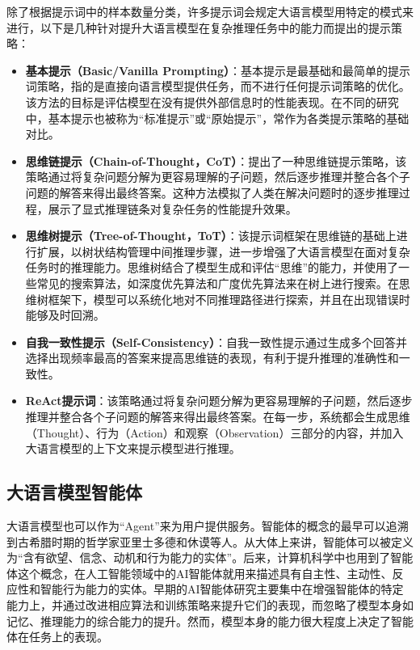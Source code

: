 除了根据提示词中的样本数量分类，许多提示词会规定大语言模型用特定的模式来进行，以下是几种针对提升大语言模型在复杂推理任务中的能力而提出的提示策略：

\begin{itemize}
    \item \textbf{基本提示（Basic/Vanilla Prompting）}：基本提示是最基础和最简单的提示词策略，指的是直接向语言模型提供任务，而不进行任何提示词策略的优化。该方法的目标是评估模型在没有提供外部信息时的性能表现。在不同的研究中，基本提示也被称为“标准提示”或“原始提示”，常作为各类提示策略的基础对比。
    \item \textbf{思维链提示（Chain-of-Thought，CoT）}：\cite{Wang2023a}提出了一种思维链提示策略，该策略通过将复杂问题分解为更容易理解的子问题，然后逐步推理并整合各个子问题的解答来得出最终答案。这种方法模拟了人类在解决问题时的逐步推理过程，展示了显式推理链条对复杂任务的性能提升效果。
    \item \textbf{思维树提示（Tree-of-Thought，ToT）}：该提示词框架在思维链的基础上进行扩展，以树状结构管理中间推理步骤，进一步增强了大语言模型在面对复杂任务时的推理能力。思维树结合了模型生成和评估“思维”的能力，并使用了一些常见的搜索算法，如深度优先算法和广度优先算法来在树上进行搜索。在思维树框架下，模型可以系统化地对不同推理路径进行探索，并且在出现错误时能够及时回溯。
    \item \textbf{自我一致性提示（Self-Consistency）}：自我一致性提示通过生成多个回答并选择出现频率最高的答案来提高思维链的表现，有利于提升推理的准确性和一致性。
    \item \textbf{ReAct提示词}：该策略通过将复杂问题分解为更容易理解的子问题，然后逐步推理并整合各个子问题的解答来得出最终答案。在每一步，系统都会生成思维（Thought）、行为（Action）和观察（Observation）三部分的内容，并加入大语言模型的上下文来提示模型进行推理。
\end{itemize}

\subsection{大语言模型智能体}

大语言模型也可以作为“Agent”来为用户提供服务。智能体的概念的最早可以追溯到古希腊时期的哲学家亚里士多德和休谟等人\cite{Zalta2019}。从大体上来讲，智能体可以被定义为“含有欲望、信念、动机和行为能力的实体”\cite{Xi2023}。后来，计算机科学中也用到了智能体这个概念，在人工智能领域中的AI智能体就用来描述具有自主性、主动性、反应性和智能行为能力的实体\cite{Wooldridge1995}。早期的AI智能体研究主要集中在增强智能体的特定能力上\cite{Sutton2018}，并通过改进相应算法和训练策略来提升它们的表现，而忽略了模型本身如记忆、推理能力的综合能力的提升。然而，模型本身的能力很大程度上决定了智能体在任务上的表现。

